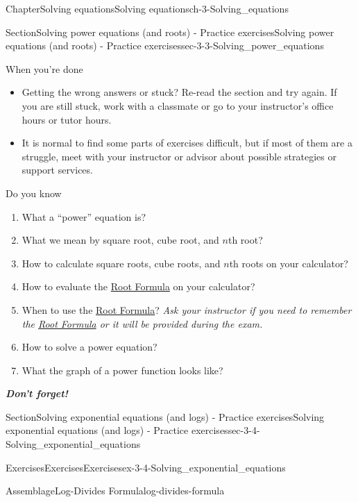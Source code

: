 \documentclass[twoside,11pt,]{book}
\newcommand{\alert}[1]{\textbf{\textit{#1}}}
\numberwithin{equation}{section}
\begin{document}
\begin{chapterptx}{Chapter}{Solving equations}{}{Solving equations}{}{}{ch-3-Solving_equations}
\begin{sectionptx}{Section}{Solving power equations (and roots) - Practice exercises}{}{Solving power equations (and roots) - Practice exercises}{}{}{sec-3-3-Solving_power_equations}
\begin{conclusion}{When you're done \textellipsis{}}
\begin{itemize}[label=\textbullet]
\item{}Getting the wrong answers or stuck? Re-read the section and try again. If you are still stuck, work with a classmate or go to your instructor's office hours or tutor hours.%
\item{}It is normal to find some parts of exercises difficult, but if most of them are a struggle, meet with your instructor or advisor about possible strategies or support services.%
\end{itemize}
%
\end{conclusion}%
\begin{conclusion}{Do you know \textellipsis{}}%
%
\begin{enumerate}[label={\Alph*.}]
\item{}What a ``power'' equation is?%
\item{}What we mean by square root, cube root, and \(n\)th root?%
\item{}How to calculate square roots, cube roots, and \(n\)th roots on your calculator?%
\item{}How to evaluate the \hyperref[root-formula]{Root Formula} on your calculator?%
\item{}When to use the \hyperref[root-formula]{Root Formula}? \emph{Ask your instructor if you need to remember the \hyperref[root-formula]{Root Formula} or it will be provided during the exam.}%
\item{}How to solve a power equation?%
\item{}What the graph of a power function looks like?%
\end{enumerate}
%
\par
\alert{Don't forget!}%
\end{conclusion}%
\end{sectionptx}
%
%
\typeout{************************************************}
\typeout{************************************************}
%
\begin{sectionptx}{Section}{Solving exponential equations (and logs) - Practice exercises}{}{Solving exponential equations (and logs) - Practice exercises}{}{}{sec-3-4-Solving_exponential_equations}
%
%
\typeout{************************************************}
\typeout{************************************************}
%
\begin{exercises-subsection-numberless}{Exercises}{Exercises}{}{Exercises}{}{}{ex-3-4-Solving_exponential_equations}
\begin{assemblage}{Assemblage}{Log-Divides Formula}{log-divides-formula}%

\end{assemblage}
\end{exercises-subsection-numberless}
\end{sectionptx}
\end{chapterptx}
\end{document}
